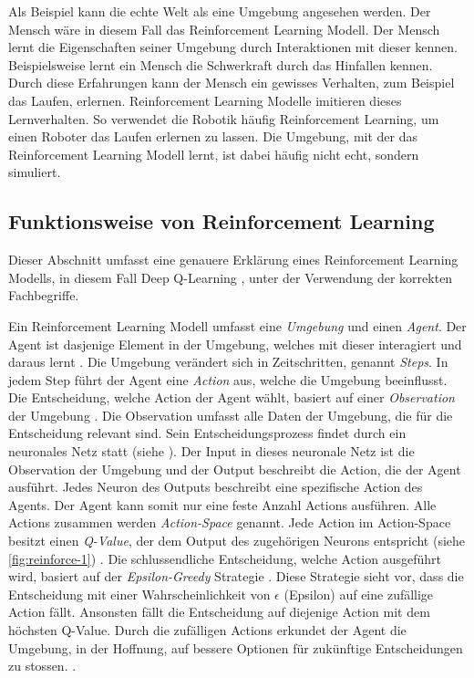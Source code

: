 Als Beispiel kann die echte Welt als eine Umgebung angesehen werden. Der Mensch
wäre in diesem Fall das Reinforcement Learning Modell. Der Mensch lernt die
Eigenschaften seiner Umgebung durch Interaktionen mit dieser kennen.
Beispielsweise lernt ein Mensch die Schwerkraft durch das Hinfallen kennen.
Durch diese Erfahrungen kann der Mensch ein gewisses Verhalten, zum Beispiel das
Laufen, erlernen. Reinforcement Learning Modelle imitieren dieses Lernverhalten.
So verwendet die Robotik häufig Reinforcement Learning, um einen Roboter das
Laufen erlernen zu lassen. Die Umgebung, mit der das Reinforcement Learning
Modell lernt, ist dabei häufig nicht echt, sondern simuliert.
 
\subsection{Funktionsweise von Reinforcement Learning}\label{sub:t_rl_func}
Dieser Abschnitt umfasst eine genauere Erklärung eines Reinforcement Learning
Modells, in diesem Fall Deep Q-Learning \cite{mnih_playing_2013}, unter der
Verwendung der korrekten Fachbegriffe.
 
Ein Reinforcement Learning Modell umfasst eine \emph{Umgebung} und einen
\emph{Agent}. Der Agent ist dasjenige Element in der Umgebung, welches mit
dieser interagiert und daraus lernt \cite[S. 53]{sutton_reinforcement_2014}. Die
Umgebung verändert sich in Zeitschritten, genannt \emph{Steps}. In jedem Step
führt der Agent eine \emph{Action} aus, welche die Umgebung beeinflusst. Die
Entscheidung, welche Action der Agent wählt, basiert auf einer
\emph{Observation} der Umgebung \cite[S. 2]{mnih_playing_2013}. Die Observation
umfasst alle Daten der Umgebung, die für die Entscheidung relevant sind. Sein Entscheidungsprozess findet durch ein neuronales Netz statt
(siehe ). Der Input in dieses neuronale Netz ist die
Observation der Umgebung und der Output beschreibt die Action, die der Agent
ausführt. Jedes Neuron des Outputs beschreibt eine spezifische Action des
Agents. Der Agent kann somit nur eine feste Anzahl Actions ausführen. Alle
Actions zusammen werden \emph{Action-Space} \cite[S.
67]{sutton_reinforcement_2014} genannt. Jede Action im Action-Space besitzt
einen \emph{Q-Value}, der dem Output des zugehörigen Neurons entspricht (siehe
\autoref{fig:reinforce-1}) \cite{wang_deep_2021}. Die schlussendliche
Entscheidung, welche Action ausgeführt wird, basiert auf der
\emph{Epsilon-Greedy} Strategie \cite[S. 34]{sutton_reinforcement_2014}. Diese
Strategie sieht vor, dass die Entscheidung mit einer Wahrscheinlichkeit von
$\epsilon$ (Epsilon) auf eine zufällige Action fällt. Ansonsten fällt die
Entscheidung auf diejenige Action mit dem höchsten Q-Value. Durch die zufälligen
Actions erkundet der Agent die Umgebung, in der Hoffnung, auf bessere Optionen
für zukünftige Entscheidungen zu stossen.
\cite{rajendra_koppula_exploration_nodate}.
 
